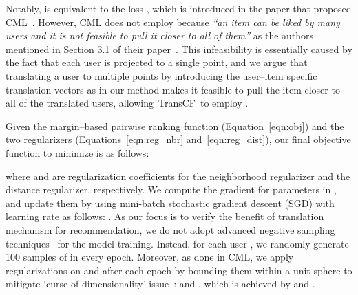 \documentclass[conference]{IEEEtran}
\newcommand{\propose}{\textsf{{TransCF}}}
\begin{document}
Notably,  is equivalent to the loss , which is introduced in the paper that proposed CML~\cite{hsieh2017collaborative}. 
However, CML does not employ  because \textit{``an item can be liked by many users and it is not feasible to pull it closer to all of them''} as the authors mentioned in Section 3.1 of their paper~\cite{hsieh2017collaborative}. This infeasibility is essentially caused by the fact that each user is projected to a single point,
and we argue that translating a user to multiple points by introducing the user--item specific translation vectors as in our method makes it feasible to pull the item closer to all of the translated users, allowing~\propose~to employ .



\medskip
{}
Given the margin--based pairwise ranking function (Equation~\ref{eqn:obj}) and the two regularizers (Equations~\ref{eqn:reg_nbr} and~\ref{eqn:reg_dist}), our final objective function  to minimize is as follows:

where  and  are regularization coefficients for the neighborhood regularizer and the distance regularizer, respectively. We compute the gradient for parameters in , and update them by using mini-batch stochastic gradient descent (SGD) with learning rate  as follows:
.
As our focus is to verify the benefit of translation mechanism for recommendation, we do not adopt advanced negative sampling techniques~\cite{he2016fast,pan2008one,rendle2014improving,weston2011wsabie} for the model training.
Instead, for each user , we randomly generate 100 samples of  in every epoch. 
Moreover, as done in CML, we apply regularizations on  and  after each epoch by bounding them within a unit sphere to mitigate `curse of dimensionality' issue~\cite{bordes2013translating,lin2015learning}:  and , which is achieved by  and .
\end{document}
